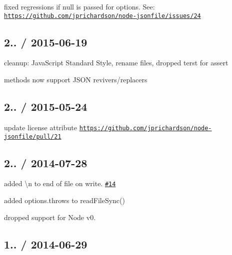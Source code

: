 \begin{DoxyItemize}
\item fixed regressions if {\ttfamily null} is passed for options. See\+: \href{https://github.com/jprichardson/node-jsonfile/issues/24}{\tt https\+://github.\+com/jprichardson/node-\/jsonfile/issues/24}
\end{DoxyItemize}

\subsection*{2.. / 2015-\/06-\/19 }


\begin{DoxyItemize}
\item cleanup\+: Java\+Script Standard Style, rename files, dropped terst for assert
\item methods now support J\+S\+O\+N revivers/replacers
\end{DoxyItemize}

\subsection*{2.. / 2015-\/05-\/24 }


\begin{DoxyItemize}
\item update license attribute \href{https://github.com/jprichardson/node-jsonfile/pull/21}{\tt https\+://github.\+com/jprichardson/node-\/jsonfile/pull/21}
\end{DoxyItemize}

\subsection*{2.. / 2014-\/07-\/28 }


\begin{DoxyItemize}
\item added {\ttfamily \textbackslash{}n} to end of file on write. \href{https://github.com/jprichardson/node-jsonfile/pull/14}{\tt \#14}
\item added {\ttfamily options.\+throws} to {\ttfamily read\+File\+Sync()}
\item dropped support for Node v0.
\end{DoxyItemize}

\subsection*{1.. / 2014-\/06-\/29 }


